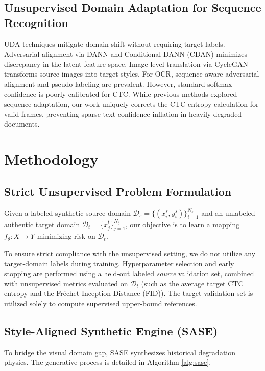 \documentclass[11pt]{article}
\begin{document}
\subsection{Unsupervised Domain Adaptation for Sequence Recognition}
UDA techniques mitigate domain shift without requiring target labels. Adversarial alignment via DANN \cite{ganin2015unsupervised} and Conditional DANN (CDAN) \cite{long2018conditional} minimizes discrepancy in the latent feature space. Image-level translation via CycleGAN \cite{zhu2017unpaired, hoffman2018cycada} transforms source images into target styles. For OCR, sequence-aware adversarial alignment \cite{zhang2019sequence} and pseudo-labeling \cite{zhao2020unsupervised, fang2021read} are prevalent. However, standard softmax confidence is poorly calibrated for CTC. While previous methods \cite{zhang2019sequence, chen2021text} explored sequence adaptation, our work uniquely corrects the CTC entropy calculation for valid frames, preventing sparse-text confidence inflation in heavily degraded documents.

\section{Methodology}

\subsection{Strict Unsupervised Problem Formulation}
Given a labeled synthetic source domain $\mathcal{D}_s = \{(x_i^s, y_i^s)\}_{i=1}^{N_s}$ and an unlabeled authentic target domain $\mathcal{D}_t = \{x_j^t\}_{j=1}^{N_t}$, our objective is to learn a mapping $f_{\theta}: X \rightarrow Y$ minimizing risk on $\mathcal{D}_t$. 

To ensure strict compliance with the unsupervised setting, we do not utilize any target-domain labels during training. Hyperparameter selection and early stopping are performed using a held-out labeled \textit{source} validation set, combined with unsupervised metrics evaluated on $\mathcal{D}_t$ (such as the average target CTC entropy and the Fr\'echet Inception Distance (FID)). The target validation set is utilized solely to compute supervised upper-bound references.

\subsection{Style-Aligned Synthetic Engine (SASE)}
To bridge the visual domain gap, SASE synthesizes historical degradation physics. The generative process is detailed in Algorithm \ref{alg:sase}.
\end{document}

